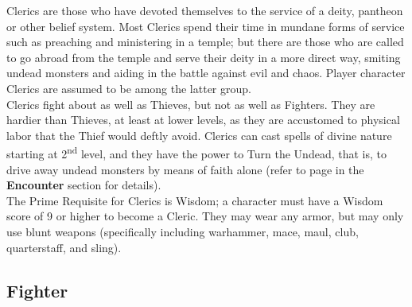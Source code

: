 \documentclass[a4paper,twoside,openany,10pt]{book}
\begin{document}
\begin{multicols}{2}
Clerics are those who have devoted themselves to the service of a deity, pantheon or other belief system. Most Clerics spend their time in mundane forms of service such as preaching and ministering in a temple; but there are those who are called to go abroad from the temple and serve their deity in a more direct way, smiting undead monsters and aiding in the battle against evil and chaos. Player character Clerics are assumed to be among the latter group.\\

Clerics fight about as well as Thieves, but not as well as Fighters. They are hardier than Thieves, at least at lower levels, as they are accustomed to physical labor that the Thief would deftly avoid. Clerics can cast spells of divine nature starting at 2\textsuperscript{nd} level, and they have the power to Turn the Undead, that is, to drive away undead monsters by means of faith alone (refer to page \hyperlink{turning-the-undead}{\pageref{turning-the-undead}} in the \textbf{Encounter} section for details).\\

The Prime Requisite for Clerics is Wisdom; a character must have a Wisdom score of 9 or higher to become a Cleric. They may wear any armor, but may only use blunt weapons (specifically including warhammer, mace, maul, club, quarterstaff, and sling).

\subsection{Fighter}\label{fighter}


\end{multicols}
\end{document}
